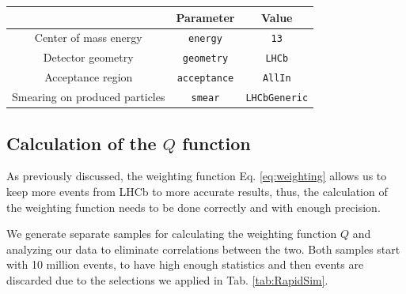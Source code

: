 \documentclass{article}
\begin{document}
        \begin{center}
                \begin{tabular}{c|c|c}
                        & Parameter & Value\\
                        \hline\hline
                        Center of mass energy & \texttt{energy} &               \texttt{13}\\
                        Detector geometry & \texttt{geometry} &                 \texttt{LHCb}\\
                        Acceptance region & \texttt{acceptance} &               \texttt{AllIn}\\
                        Smearing on produced particles & \texttt{smear} &       \texttt{LHCbGeneric}
                \end{tabular}
                \label{tab:RapidSim}
        \end{center}

        \subsection{Calculation of the $Q$ function}
        As previously discussed, the weighting function Eq. \ref{eq:weighting} allows us to keep more events from LHCb to more accurate results, thus, the calculation of 
        the weighting function needs to be done correctly and with enough precision.

        We generate separate samples for calculating the weighting function $Q$ and analyzing our data to eliminate correlations between the two.
        Both samples start with 10 million events, to have high enough statistics and then events are discarded due to the selections we applied in Tab. \ref{tab:RapidSim}.
\end{document}
